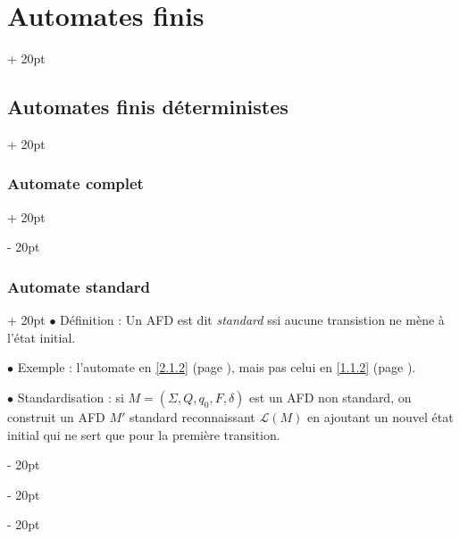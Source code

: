 \documentclass[a4paper, 12pt, twoside]{article}
\newcommand{\ind}[1][20pt]{\advance\leftskip + #1}
\newcommand{\deind}[1][20pt]{\advance\leftskip - #1}
\newenvironment{indt}[2][20pt]{#2 \par \ind[#1]}{\par \deind} %
\begin{document}
\begin{indt}{\section{Automates finis}}
\begin{indt}{\subsection{Automates finis déterministes}}
\begin{indt}{\subsubsection{Automate complet}}
\begin{center}
                \end{center}
            \end{indt}

            \vspace{12pt}
            
            \begin{indt}{\subsubsection{Automate standard}}
                $\bullet$ Définition : Un AFD est dit \emph{standard} ssi aucune transistion ne mène à l'état initial.

                \vspace{12pt}
                
                $\bullet$ Exemple : l'automate en \ref{2.1.2} (page \pageref{2.1.2}), mais pas celui en \ref{1.1.2} (page \pageref{1.1.2}).

                \vspace{12pt}
                
                $\bullet$ Standardisation : si $M = (\Sigma, Q, q_0, F, \delta)$ est un AFD non standard, on construit un AFD $M'$ standard reconnaissant $\mathcal L(M)$ en ajoutant un nouvel état initial qui ne sert que pour la première transition.


\end{indt}
\end{indt}
\end{indt}
\end{document}
